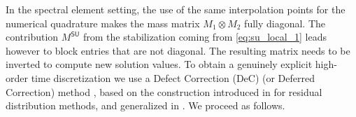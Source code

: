 \documentclass[a4paper,10pt]{article}
\begin{document}
In the spectral element setting, the use of the same interpolation points for the numerical quadrature makes the mass matrix $M_1\otimes  M_2$  fully diagonal.
The contribution $M^{\textsf{SU}}$ from the stabilization coming from \eqref{eq:su_local_1} leads however to block entries that are not diagonal.
The resulting matrix needs to be inverted to compute new solution values. 
To obtain a genuinely  explicit  high-order time discretization we use  a  Defect  Correction (DeC) (or Deferred Correction) method \cite{dutt2000spectral,minion2003semi},  
based on the construction   introduced in \cite{RA10} for residual distribution methods, and  generalized in    \cite{abgrall2017high,micalizzi2022new}.
We proceed as follows.

\end{document}
